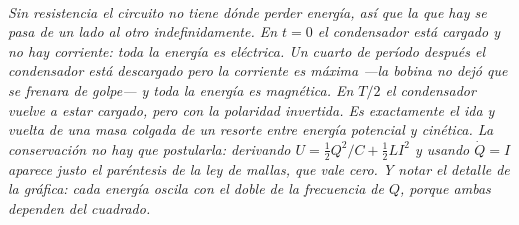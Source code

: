 \begin{center}
\begin{tikzpicture}[scale=1]
\end{tikzpicture}\\[0.5em]
{\small\itshape Sin resistencia el circuito no tiene dónde perder energía, así
que la que hay se pasa de un lado al otro indefinidamente. En $t=0$ el
condensador está cargado y no hay corriente: toda la energía es eléctrica. Un
cuarto de período después el condensador está descargado pero la corriente es
máxima ---la bobina no dejó que se frenara de golpe--- y toda la energía es
magnética. En $T/2$ el condensador vuelve a estar cargado, pero con la
polaridad invertida. Es exactamente el ida y vuelta de una masa colgada de un
resorte entre energía potencial y cinética. La conservación no hay que
postularla: derivando $U = \tfrac12 Q^2/C + \tfrac12 LI^2$ y usando
$\dot Q = I$ aparece justo el paréntesis de la ley de mallas, que vale cero. Y
notar el detalle de la gráfica: cada energía oscila con \emph{el doble} de la
frecuencia de $Q$, porque ambas dependen del cuadrado.}
\end{center}
